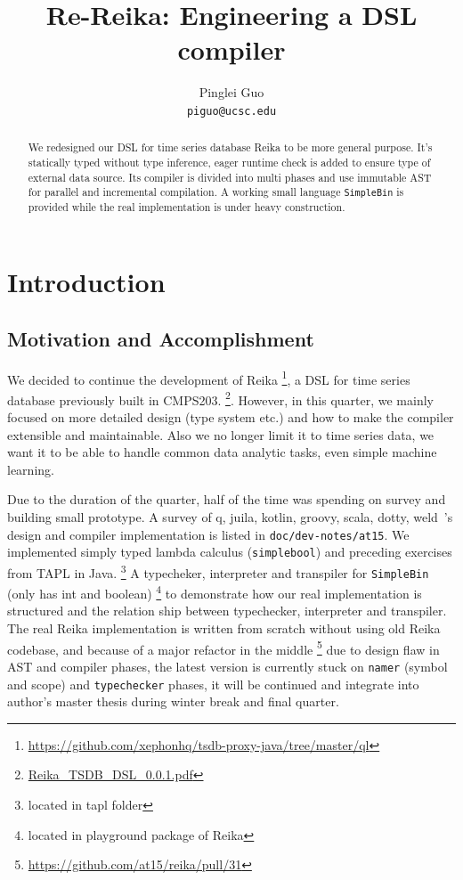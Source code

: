 \documentclass{article}
\title{Re-Reika: Engineering a DSL compiler}
\author{
Pinglei Guo \\
\texttt{piguo@ucsc.edu}
}
\begin{document}
\maketitle

\begin{abstract}
    We redesigned our DSL for time series database Reika to be more general purpose.
    It's statically typed without type inference,
    eager runtime check is added to ensure type of external data source.
    Its compiler is divided into multi phases and use immutable AST for parallel and incremental compilation.
    A working small language \verb+SimpleBin+ is provided while the real implementation is under heavy construction.
\end{abstract}

\section{Introduction}
\label{sec:introduction}

\subsection{Motivation and Accomplishment}
\label{subsec:motivation}

We decided to continue the development of Reika \footnote{\url{https://github.com/xephonhq/tsdb-proxy-java/tree/master/ql}},
a DSL for time series database previously built in CMPS203.
\footnote{\href{https://github.com/xephonhq/tsdb-proxy-java/blob/master/ql/Reika\_TSDB\_DSL\_0.0.1.pdf}{Reika\_TSDB\_DSL\_0.0.1.pdf}}.
However, in this quarter, we mainly focused on more detailed design (type system etc.)
and how to make the compiler extensible and maintainable.
Also we no longer limit it to time series data, we want it to be able to handle common data analytic tasks, even simple machine learning.

Due to the duration of the quarter, half of the time was spending on survey and building small prototype.
A survey of q, juila, kotlin, groovy, scala, dotty, weld~\cite{palkar2017weld}'s design and compiler implementation is listed in \verb+doc/dev-notes/at15+.
We implemented simply typed lambda calculus (\verb+simplebool+) and preceding exercises from TAPL in Java.
\footnote{located in tapl folder}
A typecheker, interpreter and transpiler for \verb+SimpleBin+ (only has int and boolean) \footnote{located in playground package of Reika}
to demonstrate how our real implementation is structured and the relation ship between typechecker, interpreter and transpiler.
The real Reika implementation is written from scratch without using old Reika codebase,
and because of a major refactor in the middle \footnote{\url{https://github.com/at15/reika/pull/31}} due to design flaw in AST and compiler phases, the latest version is currently stuck on
\verb+namer+ (symbol and scope) and \verb+typechecker+ phases,
it will be continued and integrate into author's master thesis during winter break and final quarter.
\end{document}
